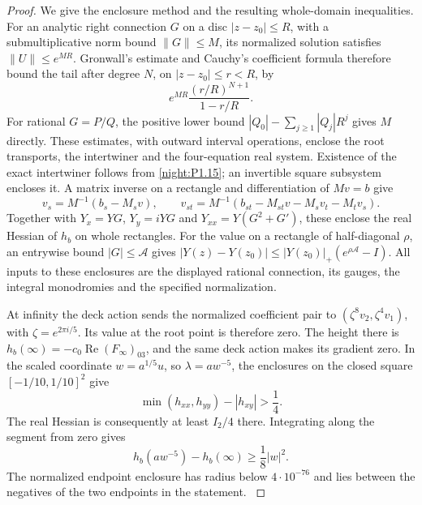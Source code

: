 \begin{proof}
We give the enclosure method and the resulting whole-domain
inequalities. For an analytic right connection $G$ on a disc
$|z-z_0|\le R$, with a submultiplicative norm bound $\|G\|\le M$,
its normalized solution satisfies $\|U\|\le e^{MR}$.
Gronwall's estimate and Cauchy's coefficient formula therefore
bound the tail after degree $N$, on $|z-z_0|\le r<R$, by
\[
 e^{MR}\frac{(r/R)^{N+1}}{1-r/R}.
\]
For rational $G=P/Q$, the positive lower bound
$|Q_0|-\sum_{j\ge1}|Q_j|R^j$ gives $M$ directly.
These estimates, with outward interval operations, enclose the
root transports, the intertwiner and the four-equation real
system. Existence of the exact intertwiner follows from
\cref{night:P1.15}; an invertible square subsystem encloses it.
A matrix inverse on a rectangle and differentiation of
$Mv=b$ give
\[
 v_s=M^{-1}(b_s-M_sv),\qquad
 v_{st}=M^{-1}(b_{st}-M_{st}v-M_sv_t-M_tv_s).
\]
Together with $Y_x=YG$, $Y_y=iYG$ and
$Y_{xx}=Y(G^2+G')$, these enclose the real Hessian of $h_b$
on whole rectangles. For the value on a rectangle of
half-diagonal $\rho$, an entrywise bound $|G|\le\mathcal A$
gives
$|Y(z)-Y(z_0)|\le|Y(z_0)|_+(e^{\rho\mathcal A}-I)$.
All inputs to these enclosures are the displayed rational
connection, its gauges, the integral monodromies and the specified
normalization.

At infinity the deck action sends the normalized coefficient
pair to $(\zeta^8v_2,\zeta^4v_1)$, with
$\zeta=e^{2\pi i/5}$. Its value at the root point is therefore
zero. The height there is
$h_b(\infty)=-c_0\operatorname{Re}(F_\infty)_{03}$,
and the same deck action makes its gradient zero.
In the scaled coordinate $w=a^{1/5}u$, so $\lambda=aw^{-5}$,
the enclosures on the closed square $[-1/10,1/10]^2$ give
\[
 \min(h_{xx},h_{yy})-|h_{xy}|>\frac14.
\]
The real Hessian is consequently at least $I_2/4$ there.
Integrating along the segment from zero gives
\[
 h_b(aw^{-5})-h_b(\infty)\ge\frac18|w|^2.
\]
The normalized endpoint enclosure has radius below $4\cdot10^{-76}$
and lies between the negatives of the two endpoints in the statement.
\hypertarget{tag-03KY}{}\label{layout:V:fresh-minimum}


\end{proof}
